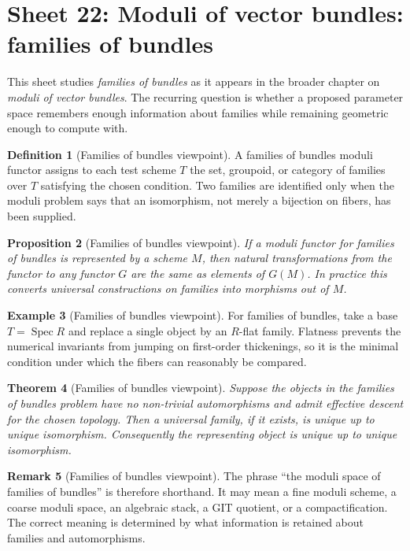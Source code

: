 \documentclass[11pt]{amsart}
\newtheorem{theorem}{Theorem}[section]
\newtheorem{proposition}[theorem]{Proposition}
\theoremstyle{definition}
\newtheorem{definition}[theorem]{Definition}
\newtheorem{example}[theorem]{Example}
\newtheorem{remark}[theorem]{Remark}
\newcommand{\Spec}{\operatorname{Spec}}
\begin{document}
\section{Sheet 22: Moduli of vector bundles: families of bundles}
This sheet studies \emph{families of bundles} as it appears in the broader chapter on \emph{moduli of vector bundles}.  The recurring question is whether a proposed parameter space remembers enough information about families while remaining geometric enough to compute with.
\begin{definition}[Families of bundles viewpoint]
A families of bundles moduli functor assigns to each test scheme $T$ the set, groupoid, or category of families over $T$ satisfying the chosen condition.  Two families are identified only when the moduli problem says that an isomorphism, not merely a bijection on fibers, has been supplied.
\end{definition}
\begin{proposition}[Families of bundles viewpoint]
If a moduli functor for families of bundles is represented by a scheme $M$, then natural transformations from the functor to any functor $G$ are the same as elements of $G(M)$.  In practice this converts universal constructions on families into morphisms out of $M$.
\end{proposition}
\begin{example}[Families of bundles viewpoint]
For families of bundles, take a base $T=\Spec R$ and replace a single object by an $R$-flat family.  Flatness prevents the numerical invariants from jumping on first-order thickenings, so it is the minimal condition under which the fibers can reasonably be compared.
\end{example}
\begin{theorem}[Families of bundles viewpoint]
Suppose the objects in the families of bundles problem have no non-trivial automorphisms and admit effective descent for the chosen topology.  Then a universal family, if it exists, is unique up to unique isomorphism.  Consequently the representing object is unique up to unique isomorphism.
\end{theorem}
\begin{remark}[Families of bundles viewpoint]
The phrase ``the moduli space of families of bundles'' is therefore shorthand.  It may mean a fine moduli scheme, a coarse moduli space, an algebraic stack, a GIT quotient, or a compactification.  The correct meaning is determined by what information is retained about families and automorphisms.
\end{remark}
\end{document}

